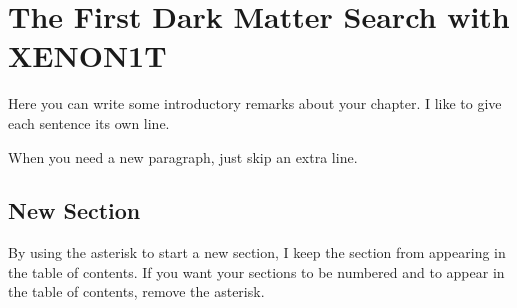 

\pagestyle{cu}
\graphicspath{{./Chapter3/images/}}

\chapter[The First Dark Matter Search with XENON1T][The First Dark Matter Search with XENON1T]{The First Dark Matter Search with XENON1T}

Here you can write some introductory remarks about your chapter.
I like to give each sentence its own line.

When you need a new paragraph, just skip an extra line.

\section*{New Section}

By using the asterisk to start a new section, I keep the section from appearing in the table of contents.
If you want your sections to be numbered and to appear in the table of contents, remove the asterisk.

